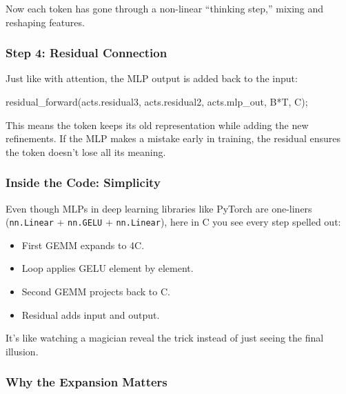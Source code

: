 \documentclass[
  letterpaper,
  DIV=11,
  numbers=noendperiod]{scrreprt}
\newenvironment{Shaded}{\begin{snugshade}}{\end{snugshade}}
\newcommand{\NormalTok}[1]{\textcolor[rgb]{0.00,0.23,0.31}{#1}}
\newcommand{\OperatorTok}[1]{\textcolor[rgb]{0.37,0.37,0.37}{#1}}
\providecommand{\tightlist}{%
  \setlength{\itemsep}{0pt}\setlength{\parskip}{0pt}}
\begin{document}
Now each token has gone through a non-linear ``thinking step,'' mixing
and reshaping features.

\subsubsection{Step 4: Residual
Connection}\label{step-4-residual-connection}

Just like with attention, the MLP output is added back to the input:

\begin{Shaded}
\begin{Highlighting}[]
\NormalTok{residual\_forward}\OperatorTok{(}\NormalTok{acts}\OperatorTok{.}\NormalTok{residual3}\OperatorTok{,}\NormalTok{ acts}\OperatorTok{.}\NormalTok{residual2}\OperatorTok{,}\NormalTok{ acts}\OperatorTok{.}\NormalTok{mlp\_out}\OperatorTok{,}\NormalTok{ B}\OperatorTok{*}\NormalTok{T}\OperatorTok{,}\NormalTok{ C}\OperatorTok{);}
\end{Highlighting}
\end{Shaded}

This means the token keeps its old representation while adding the new
refinements. If the MLP makes a mistake early in training, the residual
ensures the token doesn't lose all its meaning.

\subsubsection{Inside the Code:
Simplicity}\label{inside-the-code-simplicity}

Even though MLPs in deep learning libraries like PyTorch are one-liners
(\texttt{nn.Linear} + \texttt{nn.GELU} + \texttt{nn.Linear}), here in C
you see every step spelled out:

\begin{itemize}
\tightlist
\item
  First GEMM expands to 4C.
\item
  Loop applies GELU element by element.
\item
  Second GEMM projects back to C.
\item
  Residual adds input and output.
\end{itemize}

It's like watching a magician reveal the trick instead of just seeing
the final illusion.

\subsubsection{Why the Expansion
Matters}\label{why-the-expansion-matters}
\end{document}
